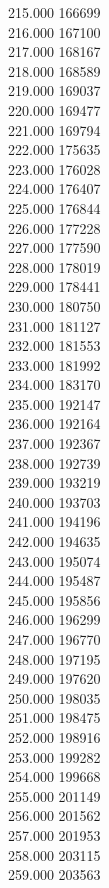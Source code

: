 { 215.000	166699 \\
 216.000	167100 \\
 217.000	168167 \\
 218.000	168589 \\
 219.000	169037 \\
 220.000	169477 \\
 221.000	169794 \\
 222.000	175635 \\
 223.000	176028 \\
 224.000	176407 \\
 225.000	176844 \\
 226.000	177228 \\
 227.000	177590 \\
 228.000	178019 \\
 229.000	178441 \\
 230.000	180750 \\
 231.000	181127 \\
 232.000	181553 \\
 233.000	181992 \\
 234.000	183170 \\
 235.000	192147 \\
 236.000	192164 \\
 237.000	192367 \\
 238.000	192739 \\
 239.000	193219 \\
 240.000	193703 \\
 241.000	194196 \\
 242.000	194635 \\
 243.000	195074 \\
 244.000	195487 \\
 245.000	195856 \\
 246.000	196299 \\
 247.000	196770 \\
 248.000	197195 \\
 249.000	197620 \\
 250.000	198035 \\
 251.000	198475 \\
 252.000	198916 \\
 253.000	199282 \\
 254.000	199668 \\
 255.000	201149 \\
 256.000	201562 \\
 257.000	201953 \\
 258.000	203115 \\
 259.000	203563 \\
}
